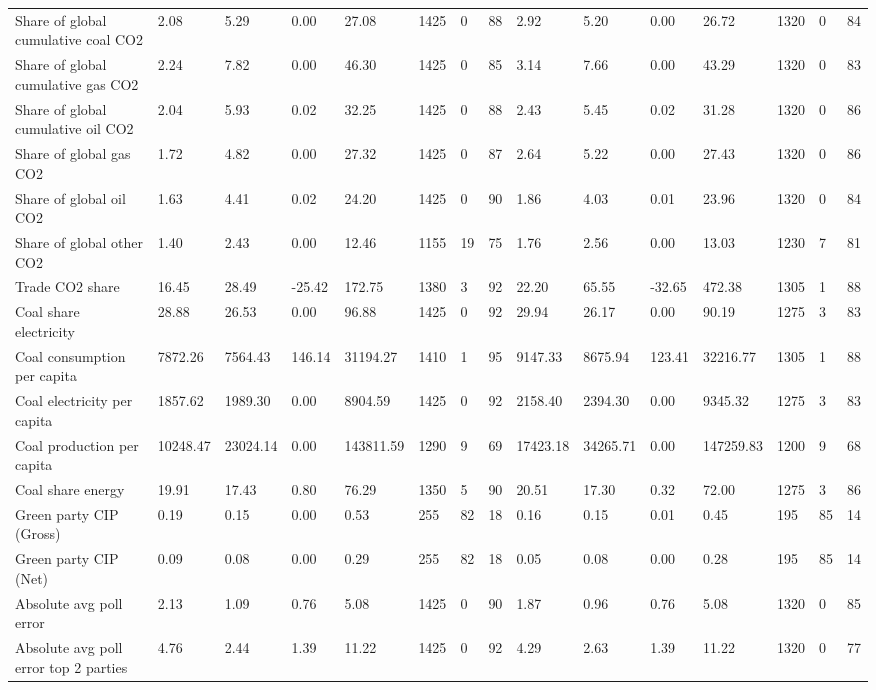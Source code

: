 \begin{longtable}{lllllllllllllll}
Share of global cumulative coal CO2 & 2.08 & 5.29 & 0.00 & 27.08 & 1425 & 0 & 88 & 2.92 & 5.20 & 0.00 & 26.72 & 1320 & 0 & 84\\
Share of global cumulative gas CO2 & 2.24 & 7.82 & 0.00 & 46.30 & 1425 & 0 & 85 & 3.14 & 7.66 & 0.00 & 43.29 & 1320 & 0 & 83\\
\addlinespace
Share of global cumulative oil CO2 & 2.04 & 5.93 & 0.02 & 32.25 & 1425 & 0 & 88 & 2.43 & 5.45 & 0.02 & 31.28 & 1320 & 0 & 86\\
Share of global gas CO2 & 1.72 & 4.82 & 0.00 & 27.32 & 1425 & 0 & 87 & 2.64 & 5.22 & 0.00 & 27.43 & 1320 & 0 & 86\\
Share of global oil CO2 & 1.63 & 4.41 & 0.02 & 24.20 & 1425 & 0 & 90 & 1.86 & 4.03 & 0.01 & 23.96 & 1320 & 0 & 84\\
Share of global other CO2 & 1.40 & 2.43 & 0.00 & 12.46 & 1155 & 19 & 75 & 1.76 & 2.56 & 0.00 & 13.03 & 1230 & 7 & 81\\
Trade CO2 share & 16.45 & 28.49 & -25.42 & 172.75 & 1380 & 3 & 92 & 22.20 & 65.55 & -32.65 & 472.38 & 1305 & 1 & 88\\
\addlinespace
Coal share electricity & 28.88 & 26.53 & 0.00 & 96.88 & 1425 & 0 & 92 & 29.94 & 26.17 & 0.00 & 90.19 & 1275 & 3 & 83\\
Coal consumption per capita & 7872.26 & 7564.43 & 146.14 & 31194.27 & 1410 & 1 & 95 & 9147.33 & 8675.94 & 123.41 & 32216.77 & 1305 & 1 & 88\\
Coal electricity per capita & 1857.62 & 1989.30 & 0.00 & 8904.59 & 1425 & 0 & 92 & 2158.40 & 2394.30 & 0.00 & 9345.32 & 1275 & 3 & 83\\
Coal production per capita & 10248.47 & 23024.14 & 0.00 & 143811.59 & 1290 & 9 & 69 & 17423.18 & 34265.71 & 0.00 & 147259.83 & 1200 & 9 & 68\\
Coal share energy & 19.91 & 17.43 & 0.80 & 76.29 & 1350 & 5 & 90 & 20.51 & 17.30 & 0.32 & 72.00 & 1275 & 3 & 86\\
\addlinespace
Green party CIP (Gross) & 0.19 & 0.15 & 0.00 & 0.53 & 255 & 82 & 18 & 0.16 & 0.15 & 0.01 & 0.45 & 195 & 85 & 14\\
Green party CIP (Net) & 0.09 & 0.08 & 0.00 & 0.29 & 255 & 82 & 18 & 0.05 & 0.08 & 0.00 & 0.28 & 195 & 85 & 14\\
Absolute avg poll error & 2.13 & 1.09 & 0.76 & 5.08 & 1425 & 0 & 90 & 1.87 & 0.96 & 0.76 & 5.08 & 1320 & 0 & 85\\
Absolute avg poll error top 2 parties & 4.76 & 2.44 & 1.39 & 11.22 & 1425 & 0 & 92 & 4.29 & 2.63 & 1.39 & 11.22 & 1320 & 0 & 77\\

\end{longtable}
